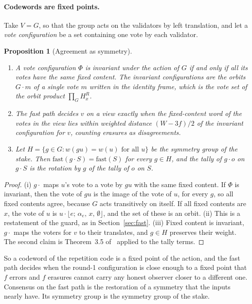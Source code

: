 \documentclass[11pt]{article}
\newtheorem{proposition}[theorem]{Proposition}
\theoremstyle{definition}
\theoremstyle{remark}
\newcommand{\act}[2]{#1\cdot #2}
\newcommand{\blk}[4]{\lfloor #1;\, #2,\, #3,\, #4\rfloor}
\begin{document}
\paragraph{Codewords are fixed points.}
Take $V=G$, so that the group acts on the validators by left translation, and
let a \emph{vote configuration} be a set containing one vote by each
validator.

\begin{proposition}[Agreement as symmetry]\label{prop:sym}
\begin{enumerate}[label=(\roman*)]
\item A vote configuration $\Phi$ is invariant under the action of $G$ if and
  only if all its votes have the same fixed content. The invariant
  configurations are the orbits $G\cdot m$ of a single vote $m$ written in the
  identity frame, which is the vote set of the orbit product
  $\prod_G H^R_x$.
\item The fast path decides $v$ on a view exactly when the fixed-content word
  of the votes in the view lies within weighted distance $(W-3f)/2$ of the
  invariant configuration for $v$, counting erasures as disagreements.
\item Let $H=\{g\in G : w(gu)=w(u)\text{ for all }u\}$ be the symmetry group
  of the stake. Then $\mathrm{fast}(\act{g}{S})=\mathrm{fast}(S)$ for every
  $g\in H$, and the tally of $\act{g}{o}$ on $\act{g}{S}$ is the rotation by
  $g$ of the tally of $o$ on $S$.
\end{enumerate}
\end{proposition}

\begin{proof}
(i) $\act{g}{}$ maps $u$'s vote to a vote by $gu$ with the same fixed content.
If $\Phi$ is invariant, then the vote of $gu$ is the image of the vote of $u$,
for every $g$, so all fixed contents agree, because $G$ acts transitively on
itself. If all fixed contents are $x$, the vote of $u$ is
$\act{u}{\blk{e}{\alpha_e}{x}{\emptyset}}$, and the set of these is an orbit.
(ii) This is a restatement of the guard, as in Section~\ref{sec:fast}.
(iii) Fixed content is invariant, $\act{g}{}$ maps the voters for $v$ to
their translates, and $g\in H$ preserves their weight. The second claim is
Theorem~3.5 of~\cite{oriented} applied to the tally terms.
\end{proof}

So a codeword of the repetition code is a fixed point of the action, and the
fast path decides when the round-1 configuration is close enough to a fixed
point that $f$ errors and $f$ erasures cannot carry any honest observer closer
to a different one. Consensus on the fast path is the restoration of a
symmetry that the inputs nearly have. Its symmetry group is the symmetry group
of the stake.
\end{document}
